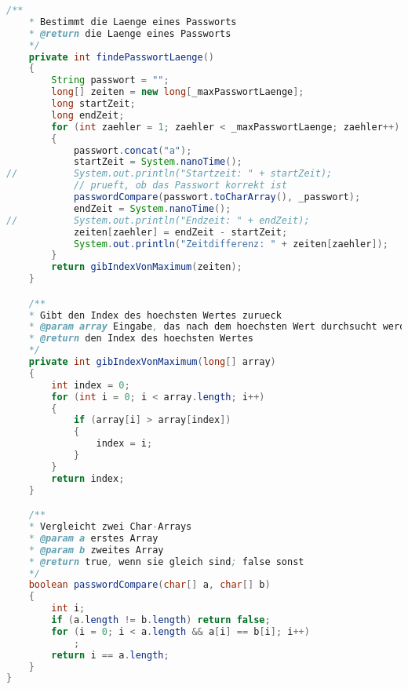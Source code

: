 \documentclass[twoside]{article}
\begin{document}
\begin{lstlisting}[language=Java]
	/**
 	* Bestimmt die Laenge eines Passworts
 	* @return die Laenge eines Passworts
 	*/
	private int findePasswortLaenge()
	{
    	String passwort = "";
    	long[] zeiten = new long[_maxPasswortLaenge];
    	long startZeit;
    	long endZeit;
    	for (int zaehler = 1; zaehler < _maxPasswortLaenge; zaehler++)
    	{
        	passwort.concat("a");
        	startZeit = System.nanoTime();
//        	System.out.println("Startzeit: " + startZeit);
        	// prueft, ob das Passwort korrekt ist
        	passwordCompare(passwort.toCharArray(), _passwort);
        	endZeit = System.nanoTime();
//        	System.out.println("Endzeit: " + endZeit);
        	zeiten[zaehler] = endZeit - startZeit;
        	System.out.println("Zeitdifferenz: " + zeiten[zaehler]);
    	}
    	return gibIndexVonMaximum(zeiten);
	}

	/**
 	* Gibt den Index des hoechsten Wertes zurueck
 	* @param array Eingabe, das nach dem hoechsten Wert durchsucht werden soll
 	* @return den Index des hoechsten Wertes
 	*/
	private int gibIndexVonMaximum(long[] array)
	{
    	int index = 0;
    	for (int i = 0; i < array.length; i++)
    	{
        	if (array[i] > array[index])
        	{
            	index = i;
        	}
    	}
    	return index;
	}

	/**
 	* Vergleicht zwei Char-Arrays
 	* @param a erstes Array
 	* @param b zweites Array
 	* @return true, wenn sie gleich sind; false sonst
 	*/
	boolean passwordCompare(char[] a, char[] b)
	{
    	int i;
    	if (a.length != b.length) return false;
    	for (i = 0; i < a.length && a[i] == b[i]; i++)
        	;
    	return i == a.length;
	}
}
\end{lstlisting}
\end{document}
